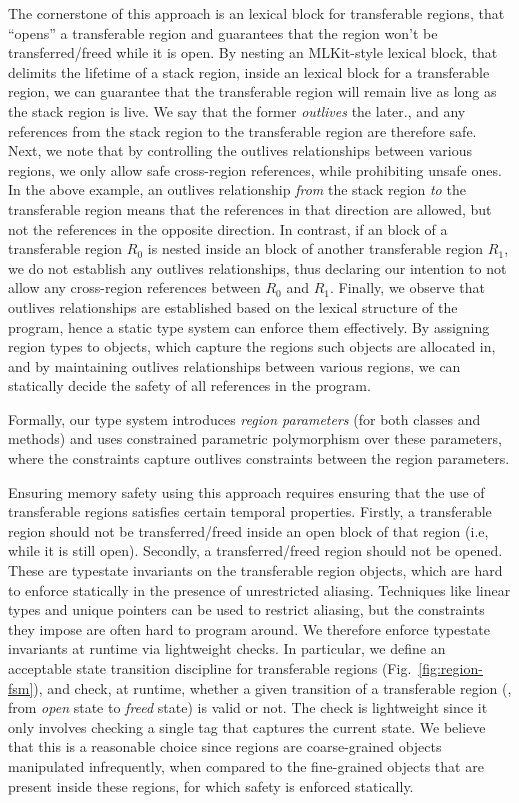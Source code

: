 The cornerstone of this approach is an  lexical block for transferable regions,
that ``opens'' a transferable region and guarantees that the region
won't be transferred/freed while it is open. By nesting an
MLKit-style  lexical block, that delimits
the lifetime of a stack region, inside an  lexical block for a
transferable region, we can guarantee that the transferable region
will remain live as long as the stack region is live. We say that the
former \emph{outlives} the later., and any references from the stack
region to the transferable region are therefore safe.  Next, we note
that by controlling the outlives relationships between various
regions, we only allow safe cross-region references, while prohibiting
unsafe ones. In the above example, an outlives relationship
\emph{from} the stack region \emph{to} the transferable region means
that the references in that direction are allowed, but not the
references in the opposite direction. In contrast, if an 
block of a transferable region $R_0$ is nested inside an 
block of another transferable region $R_1$, we do not establish any
outlives relationships, thus declaring our intention to not allow any
cross-region references between $R_0$ and $R_1$.  Finally, we observe
that outlives relationships are established based on the lexical
structure of the program, hence a static type system can enforce them
effectively. By assigning region types to objects, which capture the
regions such objects are allocated in, and by maintaining outlives
relationships between various regions, we can statically decide the
safety of all references in the program.

Formally, our type system introduces \emph{region parameters} (for both
classes and methods) and uses constrained parametric polymorphism
over these parameters, where the constraints capture outlives constraints
between the region parameters.

Ensuring memory safety using this approach requires ensuring
that the use of transferable regions satisfies certain temporal properties.
Firstly, a transferable region should not be transferred/freed
inside an open block of that region (i.e, while it is still open).
Secondly, a transferred/freed region should not be opened. These are
typestate invariants on the transferable region objects, which are
hard to enforce statically in the presence of unrestricted
aliasing. Techniques like linear types and unique pointers can be used
to restrict aliasing, but the constraints they impose are often hard
to program around. We therefore enforce typestate invariants at
runtime via lightweight checks. In particular, we define an acceptable
state transition discipline for transferable regions
(Fig.~\ref{fig:region-fsm}), and check, at runtime, whether a given
transition of a transferable region (\eg, from \emph{open} state to
\emph{freed} state) is valid or not. The check is lightweight since it
only involves checking a single tag that captures the current state.
We believe that this is a reasonable choice since regions are
coarse-grained objects manipulated infrequently, when compared to the
fine-grained objects that are present inside these regions, for which
safety is enforced statically. 

